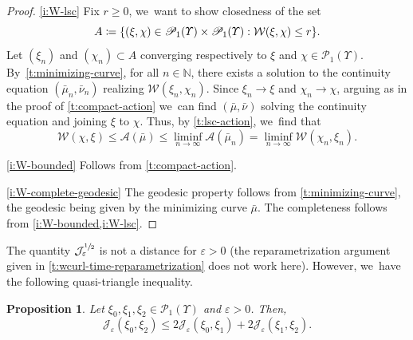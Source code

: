 \documentclass[JEP,XML,SOM,Unicode,published]{cedram}
\newtheorem{proposition}[theorem]{Proposition}
\theoremstyle{definition}
\theoremstyle{remark}
\DeclarePairedDelimiter{\set}{\lbrace}{\rbrace}
\begin{document}
\begin{proof}
\cref{i:W-lsc}
Fix $r \geq 0$, we~want to show closedness of the set
\begin{equation*}
A \coloneq \set*{ (\xi, \chi) \in \mathscr{P}_{1}(\varUpsilon) \times \mathscr{P}_{1}(\varUpsilon) : \mathcal{W}(\xi, \chi) \leq r }.
\end{equation*}
Let $(\xi_{n})$ and $(\chi_{n}) \subset A$ converging respectively to $\xi$ and $\chi \in \mathscr{P}_{1}(\varUpsilon)$.
By~\cref{t:minimizing-curve}, for all $n \in \mathbb{N}$, there exists a solution to the continuity equation $(\bar{\mu}_{n}, \bar{\nu}_{n})$ realizing $\mathcal{W}(\xi_{n}, \chi_{n})$.
Since $\xi_{n} \to \xi$ and $\chi_{n} \to \chi$, arguing as in the proof of \cref{t:compact-action} we~can find $(\bar{\mu}, \bar{\nu})$ solving the continuity equation and joining $\xi$ to $\chi$.
Thus, by \cref{t:lsc-action}, we~find that
\begin{equation*}
\mathcal{W}(\chi, \xi) \leq \mathcal{A}(\bar{\mu}) \leq \liminf_{n \to \infty} \mathcal{A}(\bar{\mu}_{n}) = \liminf_{n \to \infty} \mathcal{W}(\chi_{n}, \xi_{n}).
\end{equation*}

\cref{i:W-bounded}
Follows from \cref{t:compact-action}.

\cref{i:W-complete-geodesic}
The geodesic property follows from \cref{t:minimizing-curve}, the geodesic being given by the minimizing curve $\bar{\mu}$.
The completeness follows from \cref{i:W-bounded,i:W-lsc}.
\end{proof}

The quantity $\mathcal{J}_{\varepsilon}^{\sfrac{1}{2}}$ is not a distance for $\varepsilon > 0$ (the reparametrization argument given in \cref{t:wcurl-time-reparametrization} does not work here).
However, we~have the following quasi-triangle inequality.

\begin{proposition}\label{t:entropic-triangle-inequality}
Let $\xi_{0}, \xi_{1}, \xi_{2} \in \mathscr{P}_{1}(\varUpsilon)$ and $\varepsilon > 0$.
Then,
\begin{equation*}
\mathcal{J}_{\varepsilon}(\xi_{0}, \xi_{2}) \leq 2 \mathcal{J}_{\varepsilon}(\xi_{0}, \xi_{1}) + 2 \mathcal{J}_{\varepsilon}(\xi_{1}, \xi_{2}).
\end{equation*}
\end{proposition}
\end{document}
